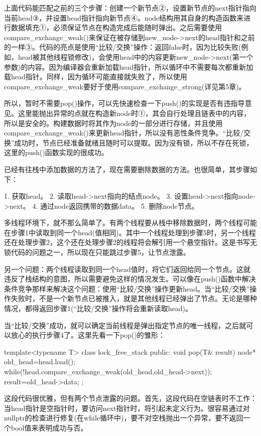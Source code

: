 上面代码能匹配之前的三个步骤：创建一个新节点②，设置新节点的next指针指向当前head③，并设置head指针指向新节点④。node结构用其自身的构造函数来进行数据填充①，必须保证节点在构造完成后能随时弹出。之后需要使用compare\_exchange\_weak()来保证在被存储到new\_node->next的head指针和之前的一样③。代码的亮点是使用“比较/交换”操作：返回false时，因为比较失败(例如，head被其他线程锁修改)，会使用head中的内容更新new\_node->next(第一个参数)的内容。因为编译器会重新加载head指针，所以循环中不需要每次都重新加载head指针。同样，因为循环可能直接就失败了，所以使用compare\_exchange\_weak要好于使用compare\_exchange\_strong(详见第5章)。

所以，暂时不需要pop()操作，可以先快速检查一下push()的实现是否有违指导意见。这里能抛出异常的点就在构造新node时①，其会自行处理且链表中的内容，所以是安全的。构建数据时将其作为node的一部分进行存储，并且使用compare\_exchange\_weak()来更新head指针，所以没有恶性条件竞争。“比较/交换”成功时，节点已经准备就绪且随时可以提取。因为没有锁，所以不存在死锁，这里的push()函数实现的很成功。

已经有往栈中添加数据的方法了，现在需要删除数据的方法。也很简单，其步骤如下：

1. 获取head。
2. 读取head->next指向的结点node。
3. 设置head->next指向node->next。
4. 通过node返回携带的数据data。
5. 删除node节点。

多线程环境下，就不那么简单了。有两个线程要从栈中移除数据时，两个线程可能在步骤1中读取到同一个head(值相同)。其中一个线程处理到步骤5时，另一个线程还在处理步骤2，这个还在处理步骤2的线程将会解引用一个悬空指针。这是书写无锁代码的问题之一，所以现在只能跳过步骤5，让节点泄露。

另一个问题：两个线程读取到同一个head值时，将它们返回给同一个节点。这就违反了栈结构的意图，所以需要避免这样的情况发生。可以像在push()函数中解决条件竞争那样来解决这个问题：使用“比较/交换”操作更新head。当“比较/交换”操作失败时，不是一个新节点已被推入，就是其他线程已经弹出了节点。无论是哪种情况，都得返回步骤1(“比较/交换”操作将会重新读取head)。

当“比较/交换”成功，就可以确定当前线程是弹出指定节点的唯一线程，之后就可以放心的执行步骤4了。这里先看一下pop()的雏形：

\begin{cpp}
template<typename T>
class lock_free_stack
{
public:
  void pop(T& result)
  {
    node* old_head=head.load();
    while(!head.compare_exchange_weak(old_head,old_head->next));
    result=old_head->data;
  }
};
\end{cpp}

这段代码很优雅，但有两个节点泄露的问题。首先，这段代码在空链表时不工作：当head指针是空指针时，要访问next指针时，将引起未定义行为。很容易通过对nullptr的检查进行修复(在while循环中)，要不对空栈抛出一个异常，要不返回一个bool值来表明成功与否。

